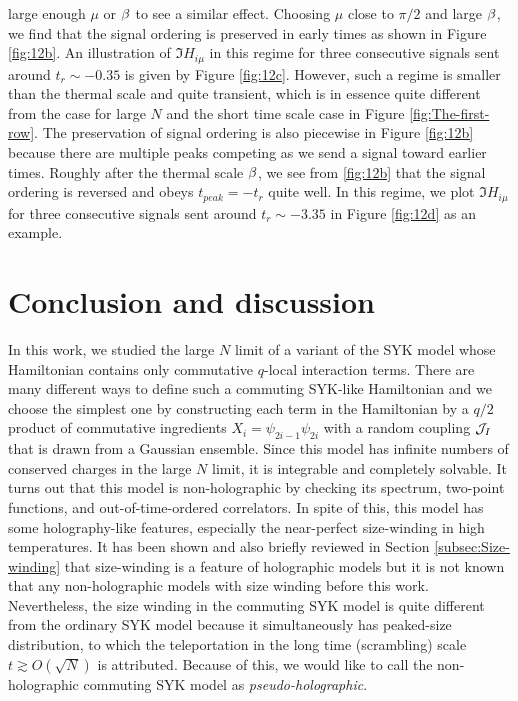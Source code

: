 \documentclass[11pt]{article}
\renewcommand{\>}{\rangle}
\newcommand{\<}{\langle}
\begin{document}
large enough $\mu$ or $\beta$ to see a similar effect. Choosing $\mu$
close to $\pi/2$ and large $\beta$, we find that the signal ordering
is preserved in early times as shown in Figure \ref{fig:12b}. An
illustration of $\Im H_{i\mu}$ in this regime for three consecutive
signals sent around $t_{r}\sim-0.35$ is given by Figure \ref{fig:12c}.
However, such a regime is smaller than the thermal scale and quite transient,
which is in essence quite different from the case for large $N$ and the
short time scale case in Figure \ref{fig:The-first-row}. The preservation
of signal ordering is also piecewise in Figure \ref{fig:12b} because
there are multiple peaks competing as we send a signal toward earlier
times. Roughly after the thermal scale $\beta$, we see from \ref{fig:12b}
that the signal ordering is reversed and obeys $t_{peak}=-t_{r}$
quite well. In this regime, we plot $\Im H_{i\mu}$ for three consecutive
signals sent around $t_{r}\sim-3.35$ in Figure \ref{fig:12d} as
an example.

\section{Conclusion and discussion\label{sec:Conclusion-and-discussion}}

In this work, we studied the large $N$ limit of a variant of the SYK
model whose Hamiltonian contains only commutative $q$-local interaction
terms. There are many different ways to define such a commuting SYK-like
Hamiltonian and we choose the simplest one by constructing each term
in the Hamiltonian by a $q/2$ product of commutative ingredients
$X_{i}=\psi_{2i-1}\psi_{2i}$ with a random coupling $\mathcal{J}_{I}$ that
is drawn from a Gaussian ensemble. Since this model has infinite numbers
of conserved charges in the large $N$ limit, it is integrable and completely
solvable. It turns out that this model is non-holographic by checking
its spectrum, two-point functions, and out-of-time-ordered correlators.
In spite of this, this model has some holography-like features, especially
the near-perfect size-winding in high temperatures. It has been shown
 and also briefly reviewed in Section \ref{subsec:Size-winding}
that size-winding is a feature of holographic models but it is not
known that any non-holographic models with size winding before this
work. Nevertheless, the size winding in the commuting SYK model is
quite different from the ordinary SYK model because it simultaneously
has peaked-size distribution, to which the teleportation in the long time
(scrambling) scale $t\gtrsim O(\sqrt{N})$ is attributed. Because
of this, we would like to call the non-holographic commuting SYK model
as \textit{pseudo-holographic}.
\end{document}
